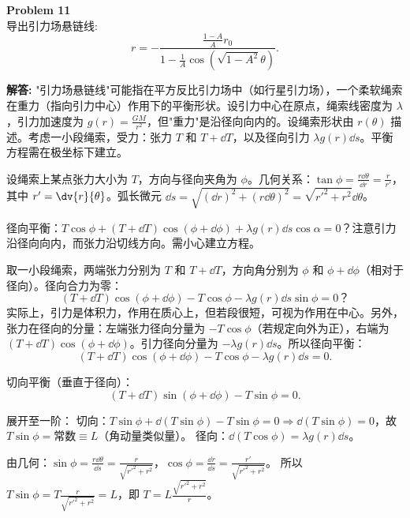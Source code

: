 \documentclass[12pt, a4paper, oneside]{ctexart}
\newenvironment{solution}{\par\noindent\textbf{解答:}\quad}{\par}
\begin{document}
\begin{mdframed}[backgroundcolor=gray!10, linewidth=0pt]
    \textbf{Problem 11} \\
    导出引力场悬链线:
    \[
    r = -\frac{\frac{1-A}{A} r_0}{1 - \frac{1}{A} \cos\left( \sqrt{1-A^2} \theta \right)}.
    \]
\end{mdframed}
\begin{solution}
    "引力场悬链线"可能指在平方反比引力场中（如行星引力场），一个柔软绳索在重力（指向引力中心）作用下的平衡形状。设引力中心在原点，绳索线密度为 \(\lambda\)，引力加速度为 \(g(r) = \frac{GM}{r^2}\)，但"重力"是沿径向向内的。设绳索形状由 \(r(\theta)\) 描述。考虑一小段绳索，受力：张力 \(T\) 和 \(T+\dd T\)，以及径向引力 \(\lambda g(r) \dd s\)。平衡方程需在极坐标下建立。
    
    设绳索上某点张力大小为 \(T\)，方向与径向夹角为 \(\phi\)。几何关系：\(\tan\phi = \frac{r \dd \theta}{\dd r} = \frac{r}{r'}\)，其中 \(r' = \dv{r}{\theta}\)。弧长微元 \(\dd s = \sqrt{(\dd r)^2 + (r \dd \theta)^2} = \sqrt{r'^2 + r^2} \dd \theta\)。
    
    径向平衡：\(T \cos\phi + (T+\dd T) \cos(\phi+\dd \phi) + \lambda g(r) \dd s \cos\alpha = 0\)？注意引力沿径向向内，而张力沿切线方向。需小心建立方程。
    
    取一小段绳索，两端张力分别为 \(T\) 和 \(T+\dd T\)，方向角分别为 \(\phi\) 和 \(\phi+\dd \phi\)（相对于径向）。径向合力为零：
    \[
    (T+\dd T) \cos(\phi+\dd \phi) - T \cos\phi - \lambda g(r) \dd s \sin\phi = 0？
    \]
    实际上，引力是体积力，作用在质心上，但若段很短，可视为作用在中心。另外，张力在径向的分量：左端张力径向分量为 \(-T \cos\phi\)（若规定向外为正），右端为 \((T+\dd T) \cos(\phi+\dd \phi)\)。引力径向分量为 \(-\lambda g(r) \dd s\)。所以径向平衡：
    \[
    (T+\dd T) \cos(\phi+\dd \phi) - T \cos\phi - \lambda g(r) \dd s = 0.
    \]
    
    切向平衡（垂直于径向）：
    \[
    (T+\dd T) \sin(\phi+\dd \phi) - T \sin\phi = 0.
    \]
    
    展开至一阶：
    切向：\(T \sin\phi + \dd(T \sin\phi) - T \sin\phi = 0 \Rightarrow \dd(T \sin\phi)=0\)，故 \(T \sin\phi = \text{常数} \equiv L\)（角动量类似量）。
    径向：\(\dd(T \cos\phi) = \lambda g(r) \dd s\)。
    
    由几何：\(\sin\phi = \frac{r \dd \theta}{\dd s} = \frac{r}{\sqrt{r'^2 + r^2}}\)，\(\cos\phi = \frac{\dd r}{\dd s} = \frac{r'}{\sqrt{r'^2 + r^2}}\)。
    所以 \(T \sin\phi = T \frac{r}{\sqrt{r'^2 + r^2}} = L\)，即 \(T = L \frac{\sqrt{r'^2 + r^2}}{r}\)。
    

\end{solution}
\end{document}
